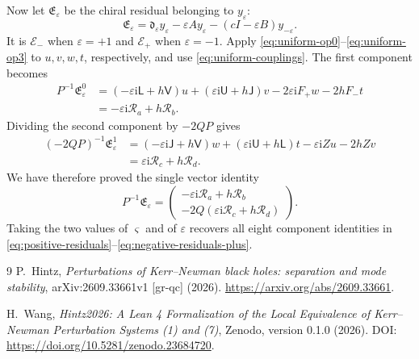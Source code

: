 \documentclass[11pt,a4paper]{article}
\numberwithin{equation}{section}
\theoremstyle{definition}
\theoremstyle{remark}
\newcommand{\I}{\mathrm i}
\newcommand{\Res}{\mathcal R}
\newcommand{\mat}[1]{\begin{pmatrix}#1\end{pmatrix}}
\newcommand{\cE}{\mathcal E}
\begin{document}
Now let \(\mathfrak E_\varepsilon\) be the chiral residual belonging to
\(y_\varepsilon\):
\[
 \mathfrak E_\varepsilon
 =\mathfrak d_\varepsilon y_\varepsilon
   -\varepsilon Ay_\varepsilon
   -(cI-\varepsilon B)y_{-\varepsilon}.
\]
It is \(\cE_-\) when \(\varepsilon=+1\) and \(\cE_+\) when
\(\varepsilon=-1\).  Apply
\eqref{eq:uniform-op0}--\eqref{eq:uniform-op3} to \(u,v,w,t\),
respectively, and use \eqref{eq:uniform-couplings}.  The first component
becomes
\begin{align*}
 P^{-1}\mathfrak E_\varepsilon^0
 &=(-\varepsilon\I\mathsf L+h\mathsf V)u
   +(\varepsilon\I\mathsf U+h\mathsf J)v
   -2\varepsilon\I F_+w-2hF_-t\\
 &=-\varepsilon\I\Res_a+h\Res_b.
\end{align*}
Dividing the second component by \(-2QP\) gives
\begin{align*}
 (-2QP)^{-1}\mathfrak E_\varepsilon^1
 &=(-\varepsilon\I\mathsf J+h\mathsf V)w
   +(\varepsilon\I\mathsf U+h\mathsf L)t
   -\varepsilon\I Zu-2hZv\\
 &=\varepsilon\I\Res_c+h\Res_d.
\end{align*}
We have therefore proved the single vector identity
\begin{equation}
 P^{-1}\mathfrak E_\varepsilon
 =\mat{-\varepsilon\I\Res_a+h\Res_b\\
       -2Q(\varepsilon\I\Res_c+h\Res_d)}.
 \label{eq:uniform-final}
\end{equation}
Taking the two values of \(\varsigma\) and of \(\varepsilon\)
recovers all eight component identities in
\eqref{eq:positive-residuals}--\eqref{eq:negative-residuals-plus}.

\begin{thebibliography}{9}
P.~Hintz,
\emph{Perturbations of Kerr--Newman black holes: separation and mode
stability},
arXiv:2609.33661v1 [gr-qc] (2026).
\newblock \url{https://arxiv.org/abs/2609.33661}.

H.~Wang,
\emph{Hintz2026: A Lean 4 Formalization of the Local Equivalence of
Kerr--Newman Perturbation Systems (1) and (7)},
Zenodo, version 0.1.0 (2026).
\newblock DOI: \url{https://doi.org/10.5281/zenodo.23684720}.
\end{thebibliography}
\end{document}
